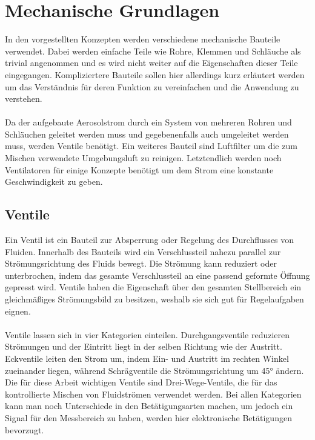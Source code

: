 \section{Mechanische Grundlagen}
In den vorgestellten Konzepten werden verschiedene mechanische Bauteile verwendet. Dabei werden einfache Teile wie Rohre, Klemmen und Schläuche als trivial angenommen und es wird nicht weiter auf die Eigenschaften dieser Teile eingegangen. Kompliziertere Bauteile sollen hier allerdings kurz erläutert werden um das Verständnis für deren Funktion zu vereinfachen und die Anwendung zu verstehen.
\\\\
Da der aufgebaute Aerosolstrom durch ein System von mehreren Rohren und Schläuchen geleitet werden muss und gegebenenfalls auch umgeleitet werden muss, werden Ventile benötigt. Ein weiteres Bauteil sind Luftfilter um die zum Mischen verwendete Umgebungsluft zu reinigen. Letztendlich werden noch Ventilatoren für einige Konzepte benötigt um dem Strom eine konstante Geschwindigkeit zu geben.

\subsection{Ventile}
Ein Ventil ist ein Bauteil zur Absperrung oder Regelung des Durchflusses von Fluiden. Innerhalb des Bauteils wird ein Verschlussteil nahezu parallel zur Strömungsrichtung des Fluids bewegt. Die Strömung kann reduziert oder unterbrochen, indem das gesamte Verschlussteil an eine passend geformte Öffnung gepresst wird. Ventile haben die Eigenschaft über den gesamten Stellbereich ein gleichmäßiges Strömungsbild zu besitzen, weshalb sie sich gut für Regelaufgaben eignen.
\\\\
Ventile lassen sich in vier Kategorien einteilen. Durchgangsventile reduzieren Strömungen und der Eintritt liegt in der selben Richtung wie der Austritt. Eckventile leiten den Strom um, indem Ein- und Austritt im rechten Winkel zueinander liegen, während Schrägventile die Strömungsrichtung um 45° ändern. Die für diese Arbeit wichtigen Ventile sind Drei-Wege-Ventile, die für das kontrollierte Mischen von Fluidströmen verwendet werden. Bei allen Kategorien kann man noch Unterschiede in den Betätigungsarten machen, um jedoch ein Signal für den Messbereich zu haben, werden hier elektronische Betätigungen bevorzugt.

